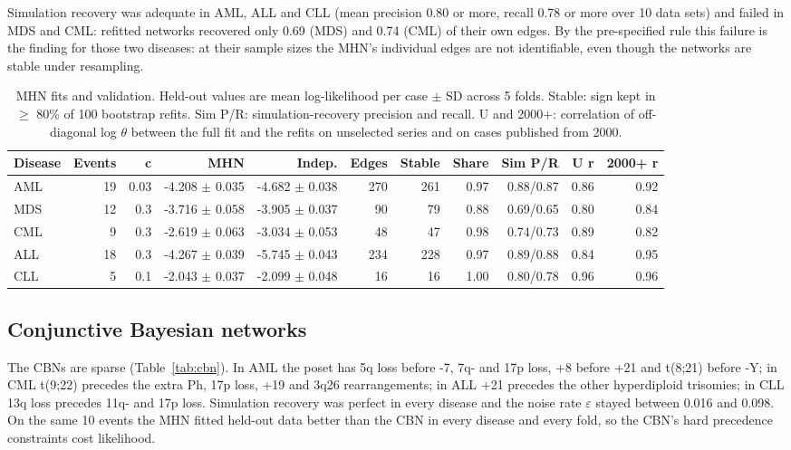 \documentclass[conference]{IEEEtran}
\begin{document}
Simulation recovery was adequate in AML, ALL and CLL (mean precision 0.80 or more, recall 0.78 or more over 10 data sets) and failed in MDS and CML: refitted networks recovered only 0.69 (MDS) and 0.74 (CML) of their own edges. By the pre-specified rule this failure is the finding for those two diseases: at their sample sizes the MHN's individual edges are not identifiable, even though the networks are stable under resampling.

\begin{table}[!t]
\centering
\caption{MHN fits and validation. Held-out values are mean log-likelihood per case $\pm$ SD across 5 folds. Stable: sign kept in $\geq$ 80\% of 100 bootstrap refits. Sim P/R: simulation-recovery precision and recall. U and 2000+: correlation of off-diagonal log $\theta$ between the full fit and the refits on unselected series and on cases published from 2000.}
\label{tab:mhn}
\footnotesize
\setlength{\tabcolsep}{3pt}
\begin{tabular}{lrrrrrrrrrr}
\toprule
\textbf{Disease} & \textbf{Events} & \textbf{c} & \textbf{MHN} & \textbf{Indep.} & \textbf{Edges} & \textbf{Stable} & \textbf{Share} & \textbf{Sim P/R} & \textbf{U r} & \textbf{2000+ r} \\
\midrule
AML & 19 & 0.03 & -4.208 $\pm$ 0.035 & -4.682 $\pm$ 0.038 & 270 & 261 & 0.97 & 0.88/0.87 & 0.86 & 0.92 \\
MDS & 12 & 0.3 & -3.716 $\pm$ 0.058 & -3.905 $\pm$ 0.037 & 90 & 79 & 0.88 & 0.69/0.65 & 0.80 & 0.84 \\
CML & 9 & 0.3 & -2.619 $\pm$ 0.063 & -3.034 $\pm$ 0.053 & 48 & 47 & 0.98 & 0.74/0.73 & 0.89 & 0.82 \\
ALL & 18 & 0.3 & -4.267 $\pm$ 0.039 & -5.745 $\pm$ 0.043 & 234 & 228 & 0.97 & 0.89/0.88 & 0.84 & 0.95 \\
CLL & 5 & 0.1 & -2.043 $\pm$ 0.037 & -2.099 $\pm$ 0.048 & 16 & 16 & 1.00 & 0.80/0.78 & 0.96 & 0.96 \\
\bottomrule
\end{tabular}
\end{table}
\subsection{Conjunctive Bayesian networks}
The CBNs are sparse (Table~\ref{tab:cbn}). In AML the poset has 5q loss before -7, 7q- and 17p loss, +8 before +21 and t(8;21) before -Y; in CML t(9;22) precedes the extra Ph, 17p loss, +19 and 3q26 rearrangements; in ALL +21 precedes the other hyperdiploid trisomies; in CLL 13q loss precedes 11q- and 17p loss. Simulation recovery was perfect in every disease and the noise rate $\varepsilon$ stayed between 0.016 and 0.098. On the same 10 events the MHN fitted held-out data better than the CBN in every disease and every fold, so the CBN's hard precedence constraints cost likelihood.
\end{document}
